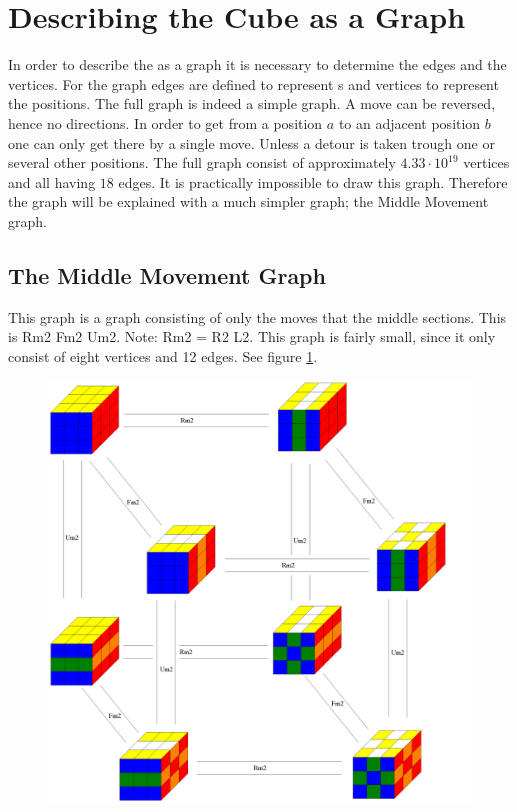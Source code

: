 
\section{Describing the Cube as a Graph}
In order to describe the \rubik{} as a graph it is necessary to determine the edges and the vertices. For the \rubik{} graph edges are defined to represent \twist{}s and vertices to represent the positions. 
The full \rubik{} graph is indeed a simple graph. A move can be reversed, hence no directions. In order to get from a position $a$ to an adjacent position $b$ one can only get there by a single move. 
Unless a detour is taken trough one or several other positions. 
The full \rubik{} graph consist of approximately $4.33\cdot10^{19}$ vertices and all having $18$ edges.
It is practically impossible to draw this graph. Therefore the graph will be explained with a much simpler graph; the Middle Movement graph.


\subsection{The Middle Movement Graph}
\label{sub:middleMoveGroup}
This graph is a \rubik{} graph consisting of only the moves that \twist{} the middle sections. 
This is Rm2 Fm2 Um2. Note: Rm2 = R2 L2.  This graph is fairly small, since it only consist of eight vertices and 12 edges. See figure \ref{fig:graphMiddleSlice2}. \cite[pp. 158-167]{Rubik87}

\begin{figure}
	\centering
		\includegraphics[width = \textwidth]{input/pics/graphMiddleSlice2.PNG}
	\caption{}
	\label{fig:graphMiddleSlice2}
\end{figure}

